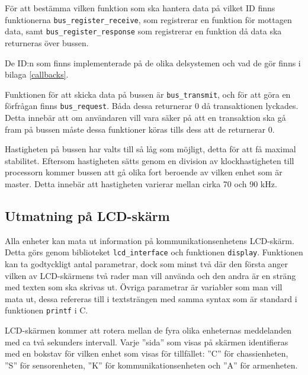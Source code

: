 För att bestämma vilken funktion som ska hantera data på vilket ID finns funktionerna \texttt{bus\_register\_receive}, som registrerar en funktion för mottagen data, samt \texttt{bus\_register\_response} som registrerar en funktion då data ska returneras över bussen.

De ID:n som finns implementerade på de olika delsystemen och vad de gör finns i bilaga \ref{callbacks}.

Funktionen för att skicka data på bussen är \verb|bus_transmit|, och för att göra en förfrågan finns \verb|bus_request|. Båda dessa returnerar 0 då transaktionen lyckades. Detta innebär att om användaren vill vara säker på att en transaktion ska gå fram på bussen måste dessa funktioner köras tills dess att de returnerar 0.

Hastigheten på bussen har valts till så låg som möjligt, detta för att få maximal stabilitet. Eftersom hastigheten sätts genom en division av klockhastigheten till processorn kommer bussen att gå olika fort beroende av vilken enhet som är master. Detta innebär att hastigheten varierar mellan cirka 70 och 90 kHz.

\subsection{Utmatning på LCD-skärm}
\label{sec:lcd_interface}

Alla enheter kan mata ut information på kommunikationsenhetens LCD-skärm. Detta görs genom biblioteket \verb|lcd_interface| och funktionen \verb|display|. Funktionen kan ta godtyckligt antal parametrar, dock som minst två där den första anger vilken av LCD-skärmens två rader man vill använda och den andra är en sträng med texten som ska skrivas ut. Övriga parametrar är variabler som man vill mata ut, dessa refereras till i textsträngen med samma syntax som är standard i funktionen \verb|printf| i C.

LCD-skärmen kommer att rotera mellan de fyra olika enheternas meddelanden med ca två sekunders intervall. Varje ''sida'' som visas på skärmen identifieras med en bokstav för vilken enhet som visas för tillfället: ''C'' för chassienheten, ''S'' för sensorenheten, ''K'' för kommunikationsenheten och ''A'' för armenheten.
